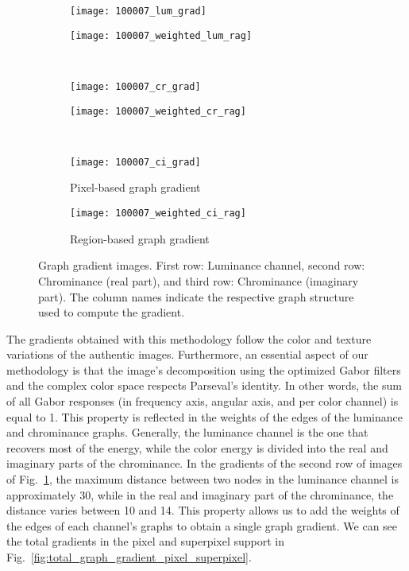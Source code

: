 \begin{figure}[!ht]
    \centering
    \begin{subfigure}[b]{0.49\textwidth}
    	\texttt{[image: 100007\_lum\_grad]} 
    \end{subfigure}         
    \begin{subfigure}[b]{0.49\textwidth}
        \texttt{[image: 100007\_weighted\_lum\_rag]}
    \end{subfigure}\\ [1ex]    
    \begin{subfigure}[b]{0.49\textwidth}
        \texttt{[image: 100007\_cr\_grad]}
    \end{subfigure}     
    \begin{subfigure}[b]{0.49\textwidth}
    	\texttt{[image: 100007\_weighted\_cr\_rag]} 
    \end{subfigure}\\ [1ex]          
    \begin{subfigure}[b]{0.49\textwidth}
        \texttt{[image: 100007\_ci\_grad]}
        \caption{Pixel-based graph gradient}
    \end{subfigure}   
    \begin{subfigure}[b]{0.49\textwidth}
        \texttt{[image: 100007\_weighted\_ci\_rag]}
        \caption{Region-based graph gradient}
    \end{subfigure}
    
	\caption{Graph gradient images. First row: Luminance channel, second row: Chrominance (real part), and third row: Chrominance (imaginary part). The column names indicate the respective graph structure used to compute the gradient.}\label{fig:graph_gradient_pixel_superpixel}    
\end{figure}

The gradients obtained with this methodology follow the color and texture variations of the authentic images. Furthermore, an essential aspect of our methodology is that the image's decomposition using the optimized Gabor filters and the complex color space respects Parseval's identity. In other words, the sum of all Gabor responses (in frequency axis, angular axis, and per color channel) is equal to 1. This property is reflected in the weights of the edges of the luminance and chrominance graphs. Generally, the luminance channel is the one that recovers most of the energy, while the color energy is divided into the real and imaginary parts of the chrominance. In the gradients of the second row of images of Fig.\ \ref{fig:graph_gradient_pixel_superpixel}, the maximum distance between two nodes in the luminance channel is approximately 30, while in the real and imaginary part of the chrominance, the distance varies between 10 and 14. This property allows us to add the weights of the edges of each channel's graphs to obtain a single graph gradient. We can see the total gradients in the pixel and superpixel support in Fig.\ \ref{fig:total_graph_gradient_pixel_superpixel}.

